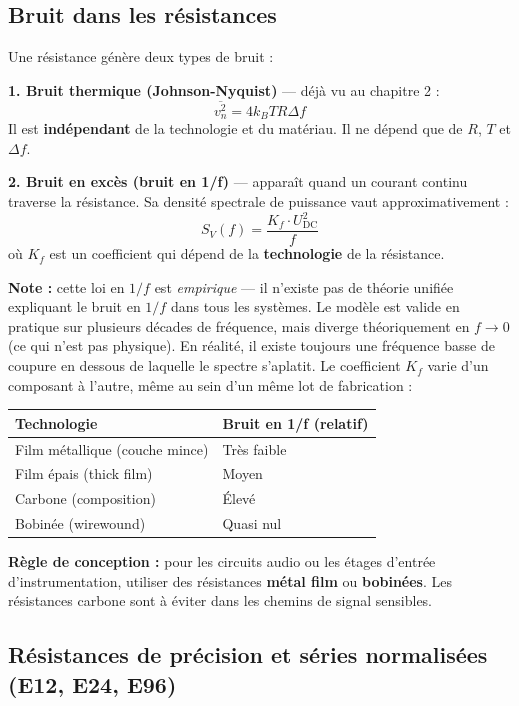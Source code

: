 \documentclass[12pt,a4paper,twoside]{book}
\begin{document}
\subsection{Bruit dans les résistances}

Une résistance génère deux types de bruit :

\textbf{1. Bruit thermique (Johnson-Nyquist)} — déjà vu au chapitre 2 :
\[
\overline{v_n^2} = 4k_B T R \Delta f
\]
Il est \textbf{indépendant} de la technologie et du matériau. Il ne dépend que de $R$, $T$ et $\Delta f$.

\textbf{2. Bruit en excès (bruit en 1/f)} — apparaît quand un courant continu traverse la résistance. Sa densité spectrale de puissance vaut approximativement :
\[
S_V(f) = \frac{K_f \cdot U_{\text{DC}}^2}{f}
\]
où $K_f$ est un coefficient qui dépend de la \textbf{technologie} de la résistance.

\textbf{Note :} cette loi en $1/f$ est \textit{empirique} — il n'existe pas de théorie unifiée expliquant le bruit en $1/f$ dans tous les systèmes. Le modèle est valide en pratique sur plusieurs décades de fréquence, mais diverge théoriquement en $f \to 0$ (ce qui n'est pas physique). En réalité, il existe toujours une fréquence basse de coupure en dessous de laquelle le spectre s'aplatit. Le coefficient $K_f$ varie d'un composant à l'autre, même au sein d'un même lot de fabrication :

\begin{center}
\begin{tabular}{ll}
\toprule
\textbf{Technologie} & \textbf{Bruit en 1/f (relatif)} \\
\midrule
Film métallique (couche mince) & Très faible \\
Film épais (thick film) & Moyen \\
Carbone (composition) & Élevé \\
Bobinée (wirewound) & Quasi nul \\
\bottomrule
\end{tabular}
\end{center}

\begin{pratique}
\textbf{Règle de conception :} pour les circuits audio ou les étages d'entrée d'instrumentation, utiliser des résistances \textbf{métal film} ou \textbf{bobinées}. Les résistances carbone sont à éviter dans les chemins de signal sensibles.
\end{pratique}

\subsection{Résistances de précision et séries normalisées (E12, E24, E96)}
\end{document}
